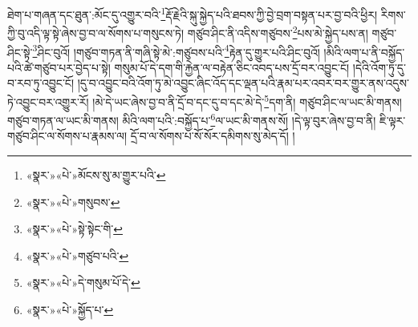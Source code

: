 ཐེག་པ་གཞན་དང་ཐུན་:མོང་དུ་འགྱུར་བའི་\footnote{«སྣར་»«པེ་»མོངས་སུ་མ་གྱུར་པའི་}རྡོ་རྗེའི་སྐུ་སྐྱེད་པའི་ཐབས་ཀྱི་བྱེ་བྲག་བསྟན་པར་བྱ་བའི་ཕྱིར། རིགས་ཀྱི་བུ་འདི་ལྟ་སྟེ་ཞེས་བྱ་བ་ལ་སོགས་པ་གསུངས་ཏེ། གཙུབ་ཤིང་ནི་འདིས་གཙུབས་\footnote{«སྣར་»«པེ་»གསུབས་}པས་མེ་སྐྱེད་པས་ན། གཙུབ་ཤིང་སྟེ་\footnote{«སྣར་»«པེ་»སྟེ་སྟེང་གི་}ཤིང་བུའོ། །གཙུབ་གཏན་ནི་གཞི་སྟེ་མེ་:གཙུབས་པའི་\footnote{«སྣར་»«པེ་»གཙུབ་པའི་}རྟེན་དུ་གྱུར་པའི་ཤིང་བུའོ། །མིའི་ལག་པ་ནི་བསྐྱོད་པའི་ཚེ་གཙུབ་པར་བྱེད་པ་སྟེ། གསུམ་པོ་དེ་དག་གི་རྐྱེན་ལ་བརྟེན་ཅིང་འབད་པས་དྲོ་བར་འབྱུང་ངོ། །དེའི་འོག་ཏུ་དུ་བ་རབ་ཏུ་འབྱུང་ངོ། །དུ་བ་འབྱུང་བའི་འོག་ཏུ་མེ་འབྱུང་ཞིང་འོད་དང་ལྡན་པའི་རྣམ་པར་འབར་བར་གྱུར་ནས་འདུས་ཏེ་འབྱུང་བར་འགྱུར་རོ། །མེ་དེ་ཡང་ཞེས་བྱ་བ་ནི་དྲོ་བ་དང་དུ་བ་དང་མེ་དེ་\footnote{«སྣར་»«པེ་»དེ་གསུམ་པོ་དེ་}དག་ནི། གཙུབ་ཤིང་ལ་ཡང་མི་གནས། གཙུབ་གཏན་ལ་ཡང་མི་གནས། མིའི་ལག་པའི་:བསྐྱོད་པ་\footnote{«སྣར་»«པེ་»སྐྱོད་པ་}ལ་ཡང་མི་གནས་སོ། །དེ་ལྟ་བུར་ཞེས་བྱ་བ་ནི། ཇི་ལྟར་གཙུབ་ཤིང་ལ་སོགས་པ་རྣམས་ལ། དྲོ་བ་ལ་སོགས་པ་སོ་སོར་དམིགས་སུ་མེད་དོ། །
